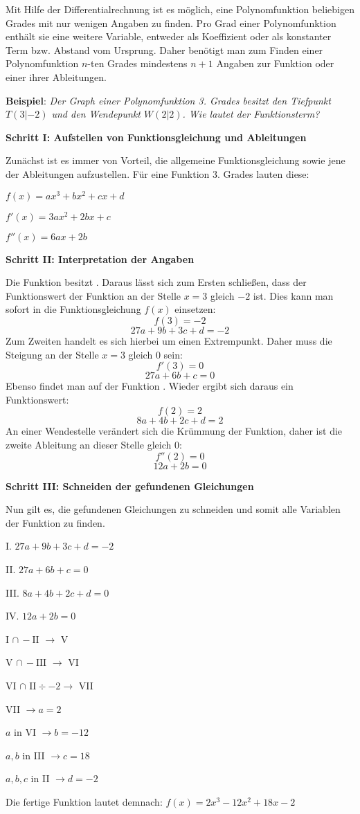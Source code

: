 
Mit Hilfe der Differentialrechnung ist es m\"{o}glich, eine Polynomfunktion beliebigen Grades mit nur wenigen Angaben zu finden. Pro Grad einer Polynomfunktion enth\"{a}lt sie eine weitere Variable, entweder als Koeffizient oder als konstanter Term bzw. Abstand vom Ursprung. Daher ben\"{o}tigt man zum Finden einer Polynomfunktion $n$-ten Grades mindestens $n + 1$ Angaben zur Funktion oder einer ihrer Ableitungen.

\textbf{Beispiel}: \emph{Der Graph einer Polynomfunktion 3. Grades besitzt den Tiefpunkt $T(3|-2)$ und den Wendepunkt $W(2|2)$. Wie lautet der Funktionsterm?}

\textbf{Schritt I: Aufstellen von Funktionsgleichung und Ableitungen}

Zun\"{a}chst ist es immer von Vorteil, die allgemeine Funktionsgleichung sowie jene der Ableitungen aufzustellen. F\"{u}r eine Funktion 3. Grades lauten diese:

$f(x) = ax^3 + bx^2 + cx + d$

$f'(x) = 3ax^2 + 2bx + c$

$f''(x) = 6ax + 2b$

\textbf{Schritt II: Interpretation der Angaben}

Die Funktion besitzt . Daraus l\"{a}sst sich zum Ersten schlie\ss{}en, dass der Funktionswert der Funktion an der Stelle $x = 3$ gleich $-2$ ist. Dies kann man sofort in die Funktionsgleichung $f(x)$ einsetzen: $$f(3) = -2$$ $$27a + 9b + 3c + d = -2$$ Zum Zweiten handelt es sich hierbei um einen Extrempunkt. Daher muss die Steigung an der Stelle $x = 3$ gleich $0$ sein: $$f'(3) = 0$$ $$27a + 6b + c = 0$$ Ebenso findet man auf der Funktion . Wieder ergibt sich daraus ein Funktionswert: $$f(2) = 2$$ $$8a + 4b + 2c + d = 2$$ An einer Wendestelle ver\"{a}ndert sich die Kr\"{u}mmung der Funktion, daher ist die zweite Ableitung an dieser Stelle gleich 0: $$f''(2) = 0$$ $$12a + 2b = 0$$

\pagebreak

\textbf{Schritt III: Schneiden der gefundenen Gleichungen}

Nun gilt es, die gefundenen Gleichungen zu schneiden und somit alle Variablen der Funktion zu finden.

I. $27a + 9b + 3c + d = -2$

II. $27a + 6b + c = 0$

III. $8a + 4b + 2c + d = 0$

IV. $12a + 2b = 0$


I $\cap\,-\text{II }\rightarrow$ V

V $\cap\,-\text{III }\rightarrow$ VI

VI $\cap \text{ II} \div -2 \rightarrow$ VII

VII $\rightarrow a = 2$

$a$ in VI $\rightarrow b = -12$

$a, b$ in III $\rightarrow c = 18$

$a, b, c$ in II $\rightarrow d = -2$

Die fertige Funktion lautet demnach: $f(x) = 2x^3 - 12x^2 + 18x - 2$ 

